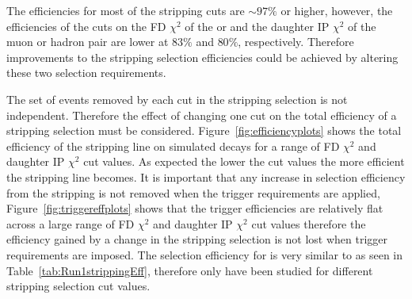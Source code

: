 The efficiencies for most of the stripping cuts are $\sim 97 \%$ or higher, however, the efficiencies of the cuts on the FD $\chi^{2}$ of the \bsd or \jpsi and the daughter IP $\chi^{2}$ of the muon or hadron pair are lower at $83 \%$ and $80 \%$, respectively. Therefore improvements to the stripping selection efficiencies could be achieved by altering these two selection requirements. 



The set of events removed by each cut in the stripping selection is not independent. Therefore the effect of changing one cut on the total efficiency of a stripping selection must be considered. Figure~\ref{fig:efficiencyplots} shows the total efficiency of the \bsmumu stripping line on simulated \bsmumu decays for a range of FD $\chi^{2}$ and daughter IP $\chi^{2}$ cut values. As expected the lower the cut values the more efficient the stripping line becomes. It is important that any increase in \bsmumu selection efficiency from the stripping is not removed when the trigger requirements are applied, Figure~\ref{fig:triggereffplots} shows that the trigger efficiencies are relatively flat across a large range of FD $\chi^{2}$ and daughter IP $\chi^{2}$ cut values therefore the efficiency gained by a change in the stripping selection is not lost when trigger requirements are imposed. The selection efficiency for \bdmumu is very similar to \bsmumu as seen in Table~\ref{tab:Run1strippingEff}, therefore only \bsmumu have been studied for different stripping selection cut values. 








